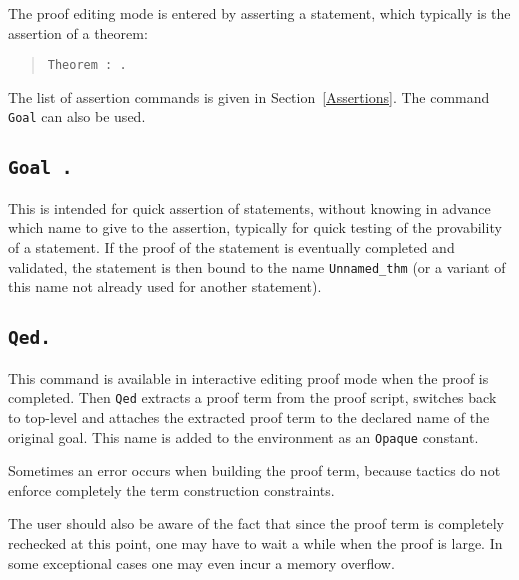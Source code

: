 The proof editing mode is entered by asserting a statement, which
typically is the assertion of a theorem:

\begin{quote}
{\tt Theorem {\ident} \zeroone{\binders} : {\form}.
\label{Theorem}}
\end{quote}

The list of assertion commands is given in
Section~\ref{Assertions}. The command {\tt Goal} can also be used.

\subsection[Goal {\form}.]{\tt Goal {\form}.\label{Goal}}

This is intended for quick assertion of statements, without knowing in
advance which name to give to the assertion, typically for quick
testing of the provability of a statement. If the proof of the
statement is eventually completed and validated, the statement is then
bound to the name {\tt Unnamed\_thm} (or a variant of this name not
already used for another statement).

\subsection[\tt Qed.]{\tt Qed.\label{Qed}}
This command is available in interactive editing proof mode when the
proof is completed.  Then {\tt Qed} extracts a proof term from the
proof script, switches back to {\Coq} top-level and attaches the
extracted proof term to the declared name of the original goal. This
name is added to the environment as an {\tt Opaque} constant.

\begin{ErrMsgs}
\item {}
\item Sometimes an error occurs when building the proof term,
because tactics do not enforce completely the term construction
constraints.

The user should also be aware of the fact that since the proof term is
completely rechecked at this point, one may have to wait a while when
the proof is large. In some exceptional cases one may even incur a
memory overflow.
\end{ErrMsgs}


